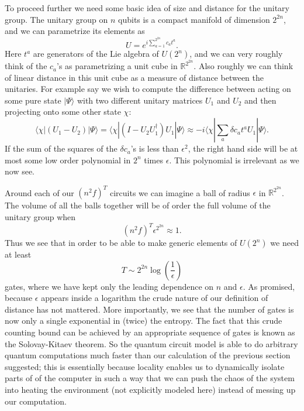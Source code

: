 \documentclass[12pt]{article}
\newcommand{\be}{\begin{equation}}
\newcommand{\ee}{\end{equation}}
\newcommand{\lan}{\langle}
\newcommand{\ran}{\rangle}
\begin{document}
To proceed further we need some basic idea of size and distance for the unitary group.  The unitary group on $n$ qubits is a compact manifold of dimension $2^{2n}$, and we can parametrize its elements as
\be
U=e^{i\sum_{a=1}^{2^{2n}}c_a t^a}.
\ee
Here $t^a$ are generators of the Lie algebra of $U(2^n)$, and we can very roughly think of the $c_a$'s as parametrizing a unit cube in $\mathbb{R}^{2^{2n}}$.  Also roughly we can think of linear distance in this unit cube as a measure of distance between the unitaries.  For example say we wish to compute the difference between acting on some pure state $|\Psi\ran$ with two different unitary matrices $U_1$ and $U_2$ and then projecting onto some other state $\chi$:
\be
\lan \chi|(U_1-U_2)|\Psi\ran=\lan \chi|\left(I-U_2U_1^\dagger\right)U_1|\Psi\ran\approx -i\lan \chi|\sum_a \delta c_a t^a U_1|\Psi\ran.
\ee
If the sum of the squares of the $\delta c_a$'s is less than $\epsilon^2$, the right hand side will be at most some low order polynomial in $2^n$ times $\epsilon$.  This polynomial is irrelevant as we now see.  

Around each of our $(n^2f)^{T}$ circuits we can imagine a ball of radius $\epsilon$ in $\mathbb{R}^{2^{2n}}$.  The volume of all the balls together will be of order the full volume of the unitary group when
\be
(n^2 f)^{T}\epsilon^{2^{2n}}\approx 1.
\ee
Thus we see that in order to be able to make generic elements of $U(2^n)$ we need at least
\be
T\sim 2^{2n}\log\left(\frac{1}{\epsilon}\right)
\ee
gates, where we have kept only the leading dependence on $n$ and $\epsilon$.  As promised, because $\epsilon$ appears inside a logarithm the crude nature of our definition of distance has not mattered.  More importantly, we see that the number of gates is now only a single exponential in (twice) the entropy.  The fact that this crude counting bound can be achieved by an appropriate sequence of gates is known as the Solovay-Kitaev theorem. So the quantum circuit model is able to do arbitrary quantum computations much faster than our calculation of the previous section suggested; this is essentially because locality enables us to dynamically isolate parts of of the computer in such a way that we can push the chaos of the system into heating the environment (not explicitly modeled here) instead of messing up our computation.  
\end{document}
